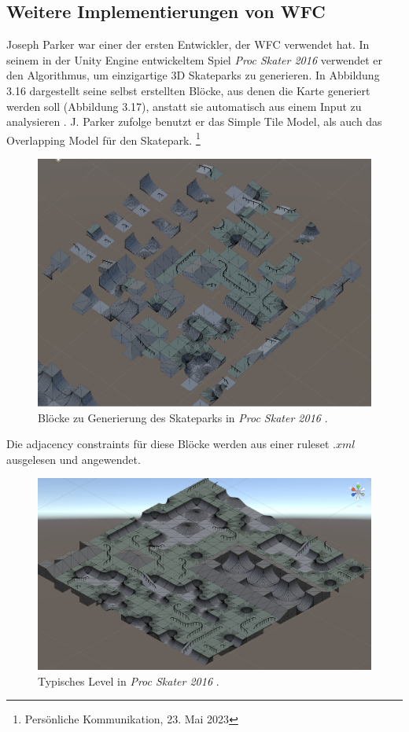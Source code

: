 \documentclass[12pt, a4paper,twoside,openany]{report} %
\begin{document}
\subsection{Weitere Implementierungen von WFC}

Joseph Parker war einer der ersten Entwickler, der WFC verwendet hat.
In seinem in der Unity Engine entwickeltem Spiel \textit{Proc Skater 2016} verwendet er den Algorithmus, um einzigartige 3D Skateparks zu generieren.
In Abbildung 3.16 dargestellt seine selbst erstellten Blöcke, aus denen die Karte generiert werden soll {(Abbildung 3.17)}, anstatt sie automatisch aus einem Input zu analysieren \cite{procskater2016}.
J. Parker zufolge benutzt er das Simple Tile Model, als auch das Overlapping Model für den Skatepark. \footnote[5]{Persönliche Kommunikation, 23. Mai 2023}

\begin{figure}[H]
    \centering
    \includegraphics[width=0.9\linewidth]{images/proc-skater-ruleset.png}%
    \caption{Blöcke zu Generierung des Skateparks in \textit{Proc Skater 2016} \cite{procskater2016}.}%
\end{figure}

Die adjacency constraints für diese Blöcke werden aus einer ruleset $.xml$ ausgelesen und angewendet.

\begin{figure}[H]
    \centering
    \includegraphics[width=0.9\linewidth]{images/proc-skate-level.png}%
    \caption{Typisches Level in \textit{Proc Skater 2016} \cite{procskater2016}.}%
\end{figure}
\end{document}
